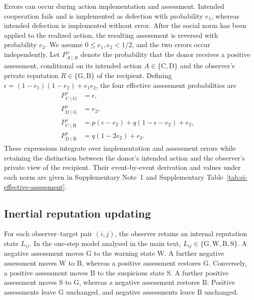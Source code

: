 \documentclass[fleqn,10pt]{wlscirep}
\begin{document}
Errors can occur during action implementation and assessment. Intended cooperation fails and is implemented as defection with probability $e_1$, whereas intended defection is implemented without error. After the social norm has been applied to the realized action, the resulting assessment is reversed with probability $e_2$. We assume $0\leq e_1,e_2<1/2$, and the two errors occur independently. Let $P^+_{A\mid R}$ denote the probability that the donor receives a positive assessment, conditional on its intended action $A\in\{\mathrm{C},\mathrm{D}\}$ and the observer's private reputation $R\in\{\mathrm{G},\mathrm{B}\}$ of the recipient. Defining $\epsilon=(1-e_1)(1-e_2)+e_1e_2$, the four effective assessment probabilities are
\begin{equation}
\begin{aligned}
P^+_{\mathrm{C}\mid\mathrm{G}}&=\epsilon,\\
P^+_{\mathrm{D}\mid\mathrm{G}}&=e_2,\\
P^+_{\mathrm{C}\mid\mathrm{B}}
&=p(\epsilon-e_2)+q(1-\epsilon-e_2)+e_2,\\
P^+_{\mathrm{D}\mid\mathrm{B}}
&=q(1-2e_2)+e_2.
\end{aligned}
\label{eq:methods-effective-assessment}
\end{equation}
These expressions integrate over implementation and assessment errors while retaining the distinction between the donor's intended action and the observer's private view of the recipient. Their event-by-event derivation and values under each norm are given in Supplementary Note~1 and Supplementary Table~\ref{tab:si-effective-assessment}.

\subsection*{Inertial reputation updating}

For each observer--target pair $(i,j)$, the observer retains an internal reputation state $L_{ij}$. In the one-step model analysed in the main text, $L_{ij}\in\{\mathrm{G},\mathrm{W},\mathrm{B},\mathrm{S}\}$. A negative assessment moves $\mathrm{G}$ to the warning state $\mathrm{W}$. A further negative assessment moves $\mathrm{W}$ to $\mathrm{B}$, whereas a positive assessment restores $\mathrm{G}$. Conversely, a positive assessment moves $\mathrm{B}$ to the suspicious state $\mathrm{S}$. A further positive assessment moves $\mathrm{S}$ to $\mathrm{G}$, whereas a negative assessment restores $\mathrm{B}$. Positive assessments leave $\mathrm{G}$ unchanged, and negative assessments leave $\mathrm{B}$ unchanged.
\end{document}
